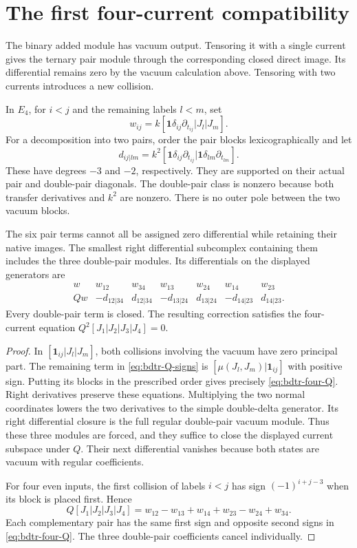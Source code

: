 \section{The first four-current compatibility}

The binary added module has vacuum output.
Tensoring it with a single current gives the ternary pair module through the corresponding closed direct image.
Its differential remains zero by the vacuum calculation above.
Tensoring with two currents introduces a new collision.

In $E_4$, for $i<j$ and the remaining labels $l<m$, set
\[
 w_{ij}=k[\mathbf1\delta_{ij}\partial_{t_{ij}}|J_l|J_m].
\]
For a decomposition into two pairs, order the pair blocks lexicographically and let
\[
 d_{ij|lm}=k^2[\mathbf1\delta_{ij}\partial_{t_{ij}}
                    |\mathbf1\delta_{lm}\partial_{t_{lm}}].
\]
These have degrees $-3$ and $-2$, respectively.
They are supported on their actual pair and double-pair diagonals.
The double-pair class is nonzero because both transfer derivatives and $k^2$ are nonzero.
There is no outer pole between the two vacuum blocks.

\begin{proposition}\label{prop:bdtr-four-current}
The six pair terms cannot all be assigned zero differential while retaining their native images.
The smallest right differential subcomplex containing them includes the three double-pair modules.
Its differentials on the displayed generators are
\begin{equation}\label{eq:bdtr-four-Q}
 \begin{array}{c|rrrrrr}
 w&w_{12}&w_{34}&w_{13}&w_{24}&w_{14}&w_{23}\\ \hline
 Qw&-d_{12|34}&d_{12|34}&-d_{13|24}&d_{13|24}
                    &-d_{14|23}&d_{14|23}.
 \end{array}
\end{equation}
Every double-pair term is closed.
The resulting correction satisfies the four-current equation $Q^2[J_1|J_2|J_3|J_4]=0$.
\end{proposition}
\begin{proof}
In $[\mathbf1_{ij}|J_l|J_m]$, both collisions involving the vacuum have zero principal part.
The remaining term in \eqref{eq:bdtr-Q-signs} is
$[\mu(J_l,J_m)|\mathbf1_{ij}]$ with positive sign.
Putting its blocks in the prescribed order gives precisely \eqref{eq:bdtr-four-Q}.
Right derivatives preserve these equations.
Multiplying the two normal coordinates lowers the two derivatives to the simple double-delta generator.
Its right differential closure is the full regular double-pair vacuum module.
Thus these three modules are forced, and they suffice to close the displayed current subspace under $Q$.
Their next differential vanishes because both states are vacuum with regular coefficients.

For four even inputs, the first collision of labels $i<j$ has sign $(-1)^{i+j-3}$ when its block is placed first.
Hence
\[
 Q[J_1|J_2|J_3|J_4]
 =w_{12}-w_{13}+w_{14}+w_{23}-w_{24}+w_{34}.
\]
Each complementary pair has the same first sign and opposite second signs in \eqref{eq:bdtr-four-Q}.
The three double-pair coefficients cancel individually.
\end{proof}

